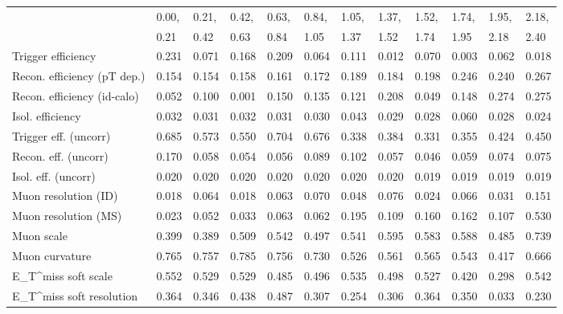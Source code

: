 \begin{tabular}{l|p{0.6cm}p{0.6cm}p{0.6cm}p{0.6cm}p{0.6cm}p{0.6cm}p{0.6cm}p{0.6cm}p{0.6cm}p{0.6cm}p{0.6cm}}
\hline
   & 0.00, & 0.21, & 0.42, & 0.63, & 0.84, & 1.05, & 1.37, & 1.52, & 1.74, & 1.95, & 2.18,  \\ 
   & 0.21 & 0.42 & 0.63 & 0.84 & 1.05 & 1.37 & 1.52 & 1.74 & 1.95 & 2.18 & 2.40  \\ 
\hline
Trigger efficiency                       & 0.231 & 0.071 & 0.168 & 0.209 & 0.064 & 0.111 & 0.012 & 0.070 & 0.003 & 0.062 & 0.018 \\
Recon. efficiency (pT dep.)              & 0.154 & 0.154 & 0.158 & 0.161 & 0.172 & 0.189 & 0.184 & 0.198 & 0.246 & 0.240 & 0.267 \\
Recon. efficiency (id-calo)              & 0.052 & 0.100 & 0.001 & 0.150 & 0.135 & 0.121 & 0.208 & 0.049 & 0.148 & 0.274 & 0.275 \\
Isol. efficiency                         & 0.032 & 0.031 & 0.032 & 0.031 & 0.030 & 0.043 & 0.029 & 0.028 & 0.060 & 0.028 & 0.024 \\
Trigger eff. (uncorr)                    & 0.685 & 0.573 & 0.550 & 0.704 & 0.676 & 0.338 & 0.384 & 0.331 & 0.355 & 0.424 & 0.450 \\
Recon. eff. (uncorr)                     & 0.170 & 0.058 & 0.054 & 0.056 & 0.089 & 0.102 & 0.057 & 0.046 & 0.059 & 0.074 & 0.075 \\
Isol. eff. (uncorr)                      & 0.020 & 0.020 & 0.020 & 0.020 & 0.020 & 0.020 & 0.020 & 0.019 & 0.019 & 0.019 & 0.019 \\
Muon resolution (ID)                     & 0.018 & 0.064 & 0.018 & 0.063 & 0.070 & 0.048 & 0.076 & 0.024 & 0.066 & 0.031 & 0.151 \\
Muon resolution (MS)                     & 0.023 & 0.052 & 0.033 & 0.063 & 0.062 & 0.195 & 0.109 & 0.160 & 0.162 & 0.107 & 0.530 \\
Muon scale                               & 0.399 & 0.389 & 0.509 & 0.542 & 0.497 & 0.541 & 0.595 & 0.583 & 0.588 & 0.485 & 0.739 \\
Muon curvature                           & 0.765 & 0.757 & 0.785 & 0.756 & 0.730 & 0.526 & 0.561 & 0.565 & 0.543 & 0.417 & 0.666 \\
E_{T}^{miss} soft scale                  & 0.552 & 0.529 & 0.529 & 0.485 & 0.496 & 0.535 & 0.498 & 0.527 & 0.420 & 0.298 & 0.542 \\
E_{T}^{miss} soft resolution             & 0.364 & 0.346 & 0.438 & 0.487 & 0.307 & 0.254 & 0.306 & 0.364 & 0.350 & 0.033 & 0.230 \\

\end{tabular}
